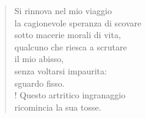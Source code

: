 
\begin{verse}
    Si rinnova nel mio viaggio\\
    la cagionevole speranza di scovare\\
    sotto macerie morali di vita,\\
    qualcuno che riesca a scrutare\\
    il mio abisso,\\
    senza voltarsi impaurita:\\
    sguardo fisso.\\!
    Questo artritico ingranaggio\\
    ricomincia la sua tosse.
\end{verse}